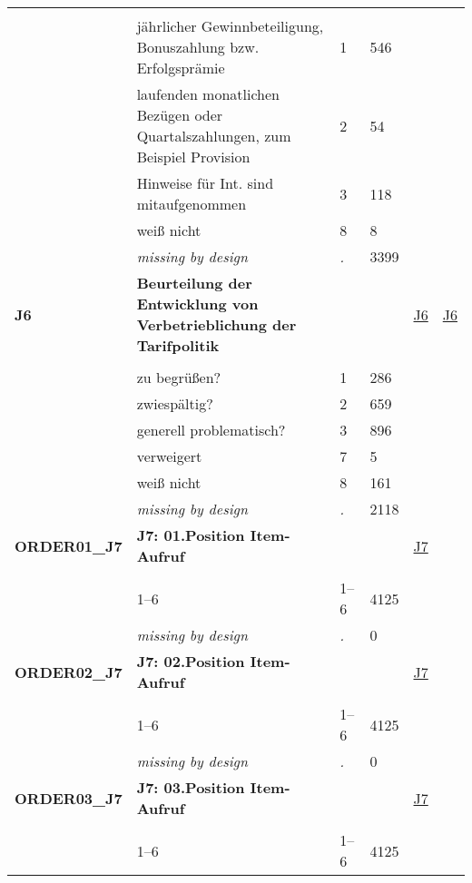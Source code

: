 \begin{longtable}{| L{2.45cm} | L{6cm} | C{1.5cm} | R{1cm} | C{2.25cm} | C{2.25cm} |}
   &  &  &  &  &  \\ 
   & jährlicher Gewinnbeteiligung, Bonuszahlung bzw. Erfolgsprämie & 1 & 546 &  &  \\ 
   & laufenden monatlichen Bezügen oder Quartalszahlungen, zum Beispiel Provision & 2 & 54 &  &  \\ 
   & Hinweise für Int. sind mitaufgenommen & 3 & 118 &  &  \\ 
   & weiß nicht & 8 & 8 &  &  \\ 
   & \textit{missing by design} & \textit{.} & 3399 &  &  \\ 
   \midrule
\textbf{J6}\label{var:J6} & \textbf{Beurteilung der Entwicklung von Verbetrieblichung der Tarifpolitik} &  &  & \hyperref[J6]{J6} & \hyperref[var:suf:J6]{J6} \\ 
   &  &  &  &  &  \\ 
   & zu begrüßen? & 1 & 286 &  &  \\ 
   & zwiespältig? & 2 & 659 &  &  \\ 
   & generell problematisch? & 3 & 896 &  &  \\ 
   & verweigert & 7 & 5 &  &  \\ 
   & weiß nicht & 8 & 161 &  &  \\ 
   & \textit{missing by design} & \textit{.} & 2118 &  &  \\ 
   \midrule
\textbf{ORDER01\_J7}\label{var:ORDER01:J7} & \textbf{J7: 01.Position Item-Aufruf} &  &  & \hyperref[J7]{J7} & \hyperref[var:suf:]{} \\ 
   &  &  &  &  &  \\ 
   & 1--6 & 1--6 & 4125 &  &  \\ 
   & \textit{missing by design} & \textit{.} & 0 &  &  \\ 
   \midrule
\textbf{ORDER02\_J7}\label{var:ORDER02:J7} & \textbf{J7: 02.Position Item-Aufruf} &  &  & \hyperref[J7]{J7} & \hyperref[var:suf:]{} \\ 
   &  &  &  &  &  \\ 
   & 1--6 & 1--6 & 4125 &  &  \\ 
   & \textit{missing by design} & \textit{.} & 0 &  &  \\ 
   \midrule
\textbf{ORDER03\_J7}\label{var:ORDER03:J7} & \textbf{J7: 03.Position Item-Aufruf} &  &  & \hyperref[J7]{J7} & \hyperref[var:suf:]{} \\ 
   &  &  &  &  &  \\ 
   & 1--6 & 1--6 & 4125 &  &  \\ 

\end{longtable}
